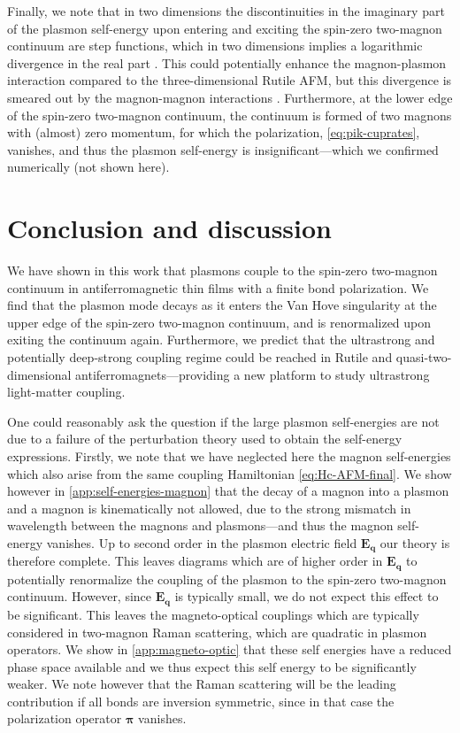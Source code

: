 \documentclass[aps,prb,reprint,twocolumns,superscriptaddress,nofootinbib]{revtex4-2}
\begin{document}
	
	Finally, we note that in two dimensions the discontinuities in the imaginary  part of the plasmon self-energy upon entering and exciting the spin-zero two-magnon continuum are step functions, which in two dimensions implies a logarithmic divergence in the real part \cite{chernyshevSpinWavesTriangular2009,zhitomirskyColloquiumSpontaneousMagnon2013}. This could potentially enhance the magnon-plasmon interaction compared to the three-dimensional Rutile AFM, but this divergence is smeared out by the magnon-magnon interactions \cite{canaliTheoryRamanScattering1992}. Furthermore, at the lower edge of the spin-zero two-magnon continuum, the continuum is formed of two magnons with (almost) zero momentum, for which the polarization, \cref{eq:pik-cuprates}, vanishes, and thus the plasmon self-energy is insignificant---which we confirmed numerically (not shown here). 
	
	
	
	
	
	
	
	\section{Conclusion and discussion}
	\label{sec:conclusion}
	We have shown in this work that plasmons couple to the spin-zero two-magnon continuum in antiferromagnetic thin films with a finite bond polarization. We find that the plasmon mode decays as it enters the Van Hove singularity at the upper edge of the spin-zero two-magnon continuum, and is renormalized upon exiting the continuum again. Furthermore, we predict that the ultrastrong and potentially deep-strong coupling regime could be reached in Rutile and quasi-two-dimensional antiferromagnets---providing a new platform to study ultrastrong light-matter coupling.
	
	One could reasonably ask the question if the large plasmon self-energies are not due to a failure of the perturbation theory used to obtain the self-energy expressions. Firstly, we note that we have neglected here the magnon self-energies which also arise from the same coupling Hamiltonian \cref{eq:Hc-AFM-final}. We show however in \cref{app:self-energies-magnon} that the decay of a magnon into a plasmon and a magnon is kinematically not allowed, due to the strong mismatch in wavelength between the magnons and plasmons---and thus the magnon self-energy vanishes. Up to second order in the plasmon electric field $\bm E_{\bm q}$ our theory is therefore complete. This leaves diagrams which are of higher order in $\bm E_{\bm q}$ to potentially renormalize the coupling of the plasmon to the spin-zero two-magnon continuum. However, since $\bm E_{\bm q}$ is typically small, we do not expect this effect to be significant. This leaves the magneto-optical couplings which are typically considered in two-magnon Raman scattering, which are quadratic in plasmon operators. We show in \cref{app:magneto-optic} that these self energies have a reduced phase space available and we thus expect this self energy to be significantly weaker. We note however that the Raman scattering will be the leading contribution if all bonds are inversion symmetric, since in that case the polarization operator $\bm \pi$ vanishes.
	
\end{document}
